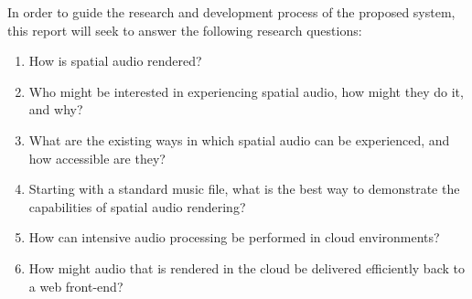 In order to guide the research and development process of the proposed system, this report will seek to answer the following research questions:

\begin{enumerate}
    \item How is spatial audio rendered?
    \item Who might be interested in experiencing spatial audio, how might they do it, and why?
    \item What are the existing ways in which spatial audio can be experienced, and how accessible are they?
    \item Starting with a standard music file, what is the best way to demonstrate the capabilities of spatial audio rendering?
    \item How can intensive audio processing be performed in cloud environments?
    \item How might audio that is rendered in the cloud be delivered efficiently back to a web front-end?

\end{enumerate}